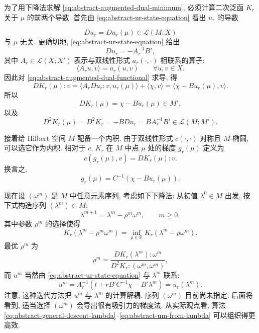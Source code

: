 为了用下降法求解 
\eqref{eq:abstract-augmented-dual-minimum},
必须计算二次泛函 $K_r$ 关于 $\mu$ 的前两个导数.
首先由 
\eqref{eq:abstract-ur-state-equation} 看出 $u_r$ 的导数

\[
Du_r=Du_r(\mu)\in\mathcal L(M;X)
\]
与 $\mu$ 无关. 更确切地, 
\eqref{eq:abstract-ur-state-equation} 给出
\[
Du_r=-A_r^{-1}B',
\]
其中 $A_r\in\mathcal L(X;X')$ 表示与双线性形式 $a_r(\cdot,\cdot)$
相联系的算子:
\[
\langle A_ru,v\rangle=a_r(u,v)
\qquad\forall u,v\in X.
\]
因此对 
\eqref{eq:abstract-augmented-dual-functional} 求导, 得
\[
DK_r(\mu)\mathbin{:}v
=\langle A_rDu_r\mathbin{:}v,u_r(\mu)\rangle+\langle\chi,v\rangle
=\langle\chi-Bu_r(\mu),v\rangle.
\]
所以
\begin{equation}\label{eq:abstract-kr-first-derivative}
DK_r(\mu)=\chi-Bu_r(\mu)\in M',
\end{equation}
以及
\begin{equation}\label{eq:abstract-kr-second-derivative}
D^2K_r(\mu)=D^2K_r=-BDu_r=BA_r^{-1}B'
\in\mathcal L(M;M').
\end{equation}

接着给 Hilbert 空间 $M$ 配备一个内积. 由于双线性形式
$c(\cdot,\cdot)$ 对称且 $M$-椭圆, 可以选它作为内积.
相对于 $c$, $K_r$ 在 $M$ 中点 $\mu$ 处的梯度 $g_r(\mu)$ 定义为
\[
c(g_r(\mu),v)=DK_r(\mu)\mathbin{:}v.
\]
换言之,
\begin{equation}\label{eq:abstract-kr-gradient}
g_r(\mu)=C^{-1}(\chi-Bu_r(\mu)).
\end{equation}

现在设 $(\omega^m)$ 是 $M$ 中任意元素序列, 考虑如下下降法:
从初值 $\lambda^0\in M$ 出发, 按下式构造序列 $(\lambda^m)\subset M$:
\begin{equation}\label{eq:abstract-general-descent-lambda}
\lambda^{m+1}=\lambda^m-\rho^m\omega^m,
\qquad m\ge0,
\end{equation}
其中参数 $\rho^m$ 的选择使得
\[
K_r(\lambda^m-\rho^m\omega^m)
=\inf_{\rho\in\mathbb R}K_r(\lambda^m-\rho\omega^m).
\]
最优 $\rho^m$ 为
\begin{equation}\label{eq:abstract-optimal-step}
\rho^m=\frac{DK_r(\lambda^m)\mathbin{:}\omega^m}
{D^2K_r\mathbin{:}(\omega^m,\omega^m)},
\end{equation}
而 $u^m$ 当然由 
\eqref{eq:abstract-ur-state-equation} 与 $\lambda^m$ 联系:
\begin{equation}\label{eq:abstract-um-from-lambda}
u^m=A_r^{-1}(l+rB'C^{-1}\chi-B'\lambda^m)=u_r(\lambda^m).
\end{equation}
注意, 这种迭代方法把 $u^m$ 与 $\lambda^m$ 的计算解耦.
序列 $(\omega^m)$ 目前尚未指定. 后面将看到, 适当选择 $(\omega^m)$
会导出很有吸引力的梯度法. 从实际观点看, 算法
\eqref{eq:abstract-general-descent-lambda}--\eqref{eq:abstract-um-from-lambda}
可以组织得更高效.

